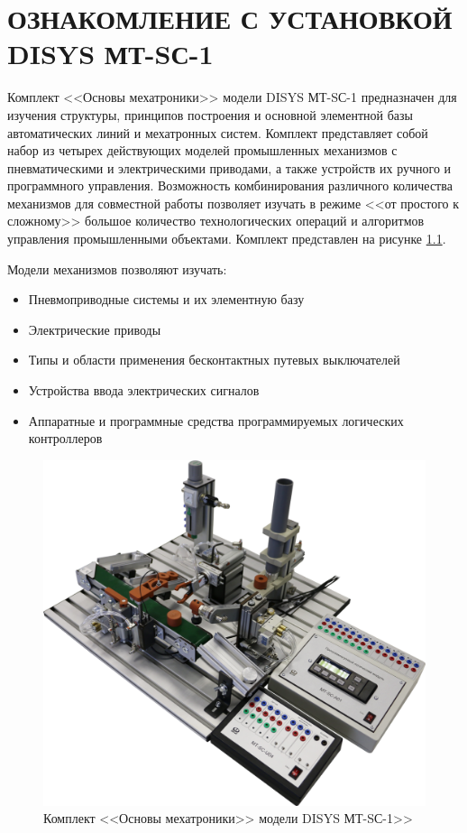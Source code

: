 \chapter{ОЗНАКОМЛЕНИЕ С УСТАНОВКОЙ DISYS МТ-SС-1}
Комплект <<Основы мехатроники>> модели DISYS МТ-SС-1 предназначен для изучения структуры, принципов построения и основной элементной базы автоматических линий и мехатронных систем.
Комплект представляет собой набор из четырех действующих моделей промышленных механизмов с пневматическими и электрическими приводами, а также устройств их ручного и программного управления.
Возможность комбинирования различного количества механизмов для совместной работы позволяет изучать в режиме <<от простого к сложному>> большое количество технологических операций и алгоритмов управления промышленными объектами. Комплект представлен на рисунке \ref{fig:all}.

Модели механизмов позволяют изучать:
\begin{itemize}
    \item Пневмоприводные системы и их элементную базу
    \item Электрические приводы
    \item Типы и области применения бесконтактных путевых выключателей
    \item Устройства ввода электрических сигналов
    \item Аппаратные и программные средства программируемых логических контроллеров
\end{itemize}


\begin{figure}[hb]
    \centering
    \includegraphics[scale=0.30]{fig/DISYS.png}
    \caption{Комплект <<Основы мехатроники>> модели DISYS МТ-SС-1>>}
    \label{fig:all}
\end{figure}

